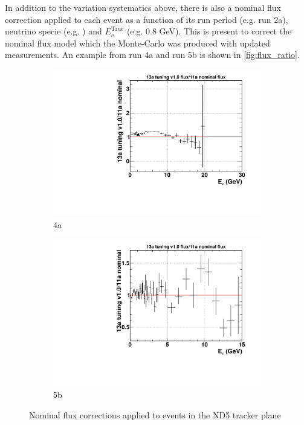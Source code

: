 In addition to the variation systematics above, there is also a nominal flux correction applied to each event as a function of its run period (e.g. run 2a), neutrino specie (e.g. \numubar) and $E_\nu^{\text{True}}$ (e.g. 0.8 GeV). This is present to correct the nominal flux model which the Monte-Carlo was produced with updated measurements. An example from run 4a and run 5b is shown in \autoref{fig:flux_ratio}.
\begin{figure}[h]
	\begin{subfigure}[t]{0.42\textwidth}
		\includegraphics[width=\textwidth, trim={0mm 0mm 0mm 0mm}, clip,page=1]{figures/flux/run4_enu_nd5_13av2_numu_rat}
		\caption{4a \numu}
	\end{subfigure}
	\begin{subfigure}[t]{0.42\textwidth}
		\includegraphics[width=\textwidth, trim={0mm 0mm 0mm 0mm}, clip,page=1]{figures/flux/run5b_enu_nd5_13av2_numubar_rat}
		\caption{5b \numubar}
	\end{subfigure}
	\caption{Nominal flux corrections applied to events in the ND5 tracker plane}
	\label{fig:flux_ratio}
\end{figure}

